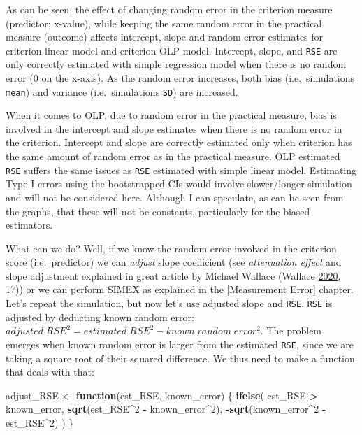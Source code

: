 \documentclass[
]{book}
\newenvironment{Shaded}{\begin{snugshade}}{\end{snugshade}}
\newcommand{\ControlFlowTok}[1]{\textcolor[rgb]{0.13,0.29,0.53}{\textbf{#1}}}
\newcommand{\DecValTok}[1]{\textcolor[rgb]{0.00,0.00,0.81}{#1}}
\newcommand{\KeywordTok}[1]{\textcolor[rgb]{0.13,0.29,0.53}{\textbf{#1}}}
\newcommand{\NormalTok}[1]{#1}
\newcommand{\OperatorTok}[1]{\textcolor[rgb]{0.81,0.36,0.00}{\textbf{#1}}}
\newcommand{\StringTok}[1]{\textcolor[rgb]{0.31,0.60,0.02}{#1}}
\begin{document}
As can be seen, the effect of changing random error in the criterion measure (predictor; x-value), while keeping the same random error in the practical measure (outcome) affects intercept, slope and random error estimates for criterion linear model and criterion OLP model. Intercept, slope, and \texttt{RSE} are only correctly estimated with simple regression model when there is no random error (0 on the x-axis). As the random error increases, both bias (i.e.~simulations \texttt{mean}) and variance (i.e.~simulations \texttt{SD}) are increased.

When it comes to OLP, due to random error in the practical measure, bias is involved in the intercept and slope estimates when there is no random error in the criterion. Intercept and slope are correctly estimated only when criterion has the same amount of random error as in the practical measure. OLP estimated \texttt{RSE} suffers the same issues as \texttt{RSE} estimated with simple linear model.
Estimating Type I errors using the bootstrapped CIs would involve slower/longer simulation and will not be considered here. Although I can speculate, as can be seen from the graphs, that these will not be constants, particularly for the biased estimators.

What can we do? Well, if we know the random error involved in the criterion score (i.e.~predictor) we can \emph{adjust} slope coefficient (see \emph{attenuation effect} and slope adjustment explained in great article by Michael Wallace (Wallace \protect\hyperlink{ref-wallaceAnalysisImperfectWorld2020}{2020}, 17)) or we can perform SIMEX as explained in the {[}Measurement Error{]} chapter. Let's repeat the simulation, but now let's use adjusted slope and \texttt{RSE}. \texttt{RSE} is adjusted by deducting known random error: \(adjusted \;RSE^2 = estimated \; RSE^2 - known \; random \; error ^2\). The problem emerges when known random error is larger from the estimated \texttt{RSE}, since we are taking a square root of their squared difference. We thus need to make a function that deals with that:

\begin{Shaded}
\begin{Highlighting}[]
\NormalTok{adjust\_RSE <{-}}\StringTok{ }\ControlFlowTok{function}\NormalTok{(est\_RSE, known\_error) \{}
  \KeywordTok{ifelse}\NormalTok{(}
\NormalTok{    est\_RSE }\OperatorTok{>}\StringTok{ }\NormalTok{known\_error,}
    \KeywordTok{sqrt}\NormalTok{(est\_RSE}\OperatorTok{\^{}}\DecValTok{2} \OperatorTok{{-}}\StringTok{ }\NormalTok{known\_error}\OperatorTok{\^{}}\DecValTok{2}\NormalTok{),}
    \OperatorTok{{-}}\KeywordTok{sqrt}\NormalTok{(known\_error}\OperatorTok{\^{}}\DecValTok{2} \OperatorTok{{-}}\StringTok{ }\NormalTok{est\_RSE}\OperatorTok{\^{}}\DecValTok{2}\NormalTok{)}
\NormalTok{  )}
\NormalTok{\}}
\end{Highlighting}
\end{Shaded}
\end{document}
